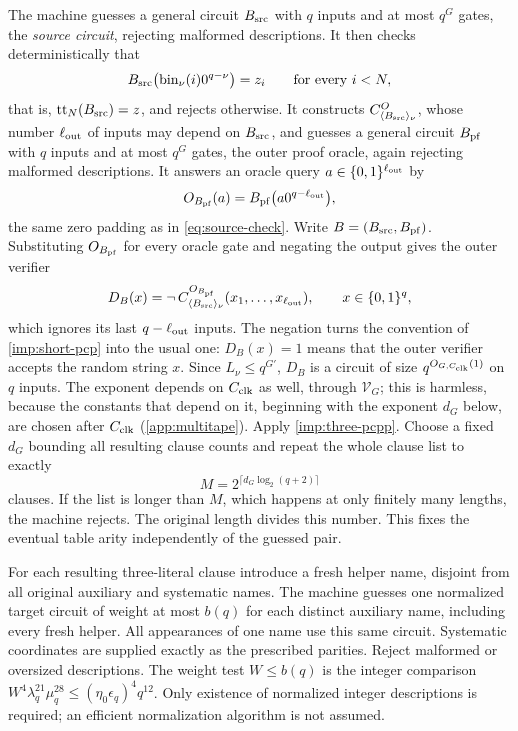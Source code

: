 \documentclass[11pt,letterpaper]{article}
\theoremstyle{definition}
\theoremstyle{remark}
\begin{document}
The machine guesses a general circuit $B_{\rm src}$ with $q$ inputs and
at most $q^G$ gates, the \emph{source circuit}, rejecting malformed
descriptions. It then checks deterministically that
\begin{equation}\label{eq:source-check}
 B_{\rm src}\bigl(\mathrm{bin}_\nu(i)0^{q-\nu}\bigr)=z_i
 \qquad\text{for every }i<N,
\end{equation}
that is, $\mathrm{tt}_N(B_{\rm src})=z$, and rejects otherwise. It
constructs $C^O_{\langle B_{\rm src}\rangle_\nu}$, whose number
$\ell_{\rm out}$ of inputs may depend on $B_{\rm src}$, and guesses a
general circuit $B_{\rm pf}$ with $q$ inputs and at most $q^G$ gates,
the outer proof oracle, again rejecting malformed descriptions. It
answers an oracle query $a\in\{0,1\}^{\ell_{\rm out}}$ by
\[
 O_{B_{\rm pf}}(a)=B_{\rm pf}\bigl(a0^{q-\ell_{\rm out}}\bigr),
\]
the same zero padding as in \eqref{eq:source-check}. Write
$B=(B_{\rm src},B_{\rm pf})$. Substituting $O_{B_{\rm pf}}$ for every
oracle gate and negating the output gives the outer verifier
\[
 D_B(x)=\neg\,C^{O_{B_{\rm pf}}}_{\langle B_{\rm src}\rangle_\nu}
 (x_1,\ldots,x_{\ell_{\rm out}}),\qquad x\in\{0,1\}^q,
\]
which ignores its last $q-\ell_{\rm out}$ inputs. The negation turns
the convention of \cref{imp:short-pcp} into the usual one: $D_B(x)=1$
means that the outer verifier accepts the random string $x$. Since
$L_\nu\le q^{G'}$, $D_B$ is a circuit of size $q^{O_{G,C_{\rm clk}}(1)}$ on $q$
inputs. The exponent depends on $C_{\rm clk}$ as well, through
$\mathcal V_G$; this is harmless, because the constants that depend on
it, beginning with the exponent $d_G$ below, are chosen after
$C_{\rm clk}$ (\cref{app:multitape}). Apply \cref{imp:three-pcpp}. Choose a fixed $d_G$ bounding
all resulting clause counts and repeat the whole clause list to
exactly
\[
 M=2^{\lceil d_G\log_2(q+2)\rceil}
\]
clauses. If the list is longer than $M$, which happens at only
finitely many lengths, the machine rejects. The original length divides
this number. This fixes the eventual table arity independently of the
guessed pair.

For each resulting three-literal clause introduce a fresh helper name,
disjoint from all original auxiliary and systematic names. The
machine guesses one normalized target circuit of weight at most
$b(q)$ for each distinct auxiliary name, including every fresh
helper. All appearances of one name use this same circuit.
Systematic coordinates are supplied exactly as the prescribed
parities. Reject malformed or oversized descriptions. The weight test $W\le b(q)$ is the
integer comparison $W^4\lambda_q^{21}\mu_q^{28}\le(\eta_0\epsilon_q)^4q^{12}$. Only existence
of normalized integer descriptions is required; an efficient
normalization algorithm is not assumed.
\end{document}
